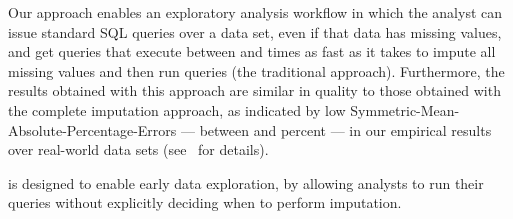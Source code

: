 

Our approach enables an exploratory analysis workflow in which the analyst can issue standard SQL queries over a data set, even if that data has missing values, and get
queries that execute between \lowxalphazero{} and \highxalphazeroexacs{} times as fast as it takes to impute all missing values and then run queries (the traditional approach). Furthermore, the results obtained with this approach
are similar in quality to those obtained with the complete imputation approach, as indicated by low Symmetric-Mean-Absolute-Percentage-Errors --- between \lowsmapealphazero{} and \highsmapealphaoneexacs{} percent --- in our empirical results
over real-world data sets (see~ for details).

\ProjectName{} is designed to enable early data exploration, by allowing analysts to run their queries without explicitly deciding when to perform imputation.

